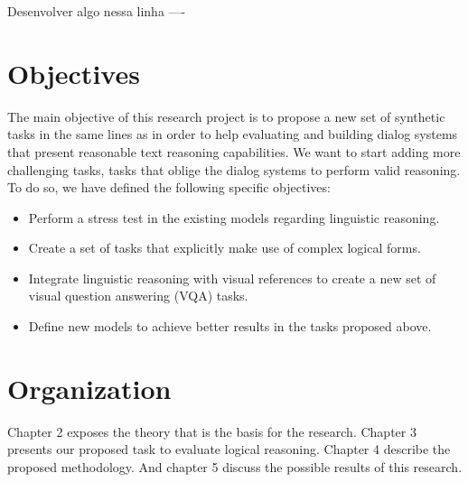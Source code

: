 Desenvolver algo nessa linha ----


\section{Objectives}
\label{sec:objectives}

The main objective of this research project is to propose a new set of synthetic tasks in the same lines as \cite{WestonBCM15} in order to help evaluating and building dialog systems that present reasonable text reasoning capabilities. We want to start adding more challenging tasks, tasks that oblige the dialog systems to perform valid reasoning. To do so, we have defined the following specific objectives:

\begin{itemize}
\item Perform a stress test in the existing models regarding linguistic reasoning.
\item Create a set of tasks that explicitly make use of complex logical forms.
\item Integrate linguistic reasoning with visual references to create a new set of visual question answering (VQA) tasks.
\item Define new models to achieve better results in the tasks proposed above. 
\end{itemize}



\section{Organization}
\label{sec:organization}

Chapter 2 exposes the theory that is the basis for the research. Chapter 3 presents our proposed task to evaluate logical reasoning. Chapter 4 describe the proposed methodology. And chapter 5 discuss the possible results of this research.



